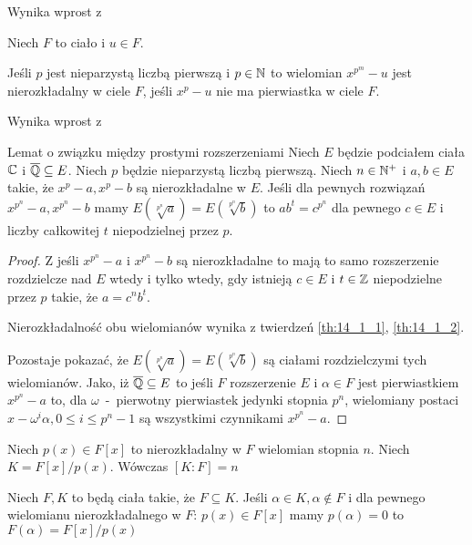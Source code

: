   Wynika wprost z \cite[Twierdzenie 14.1.1]{rom06}

\begin{theorem}
  Niech $F$ to ciało i $u \in F$.

  Jeśli $p$ jest nieparzystą liczbą pierwszą i $p \in \mathbb{N}$ to wielomian
  $x^{p^m} - u$ jest nierozkładalny w ciele $F$, jeśli
  $x^p - u$ nie ma pierwiastka w ciele $F$.
  \label{th:14_1_2}
\end{theorem}

  Wynika wprost z \cite[Twierdzenie 14.1.2]{rom06}

\begin{lemma}{Lemat o związku między prostymi rozszerzeniami}
  Niech $E$ będzie podciałem ciała $\mathbb{C}$ i $\overline{\mathbb{Q}} \subseteq E$.
  Niech $p$ będzie nieparzystą liczbą pierwszą.
  Niech $n \in \mathbb{N}^+$ i $a, b \in E$ takie, że $x^p
  - a, x^p - b$ są nierozkładalne w $E$.
  Jeśli dla pewnych rozwiązań $x^{p^n} - a, x^{p^n} -b$ mamy
  $E\left(\! \sqrt[p^n]{a}\right) = E\left(\! \sqrt[p^n]{b}\right)$ to $ab^t =
  c^{p^n}$ dla pewnego $c \in E$ i liczby całkowitej $t$ niepodzielnej przez
  $p$.
  \label{lem:associated_extensions}
\end{lemma}
\begin{proof}
  Z \cite[Twierdzenie 14.2.8]{rom06} jeśli $x^{p^n} - a$ i $x^{p^n} - b$ są
  nierozkładalne to mają to samo rozszerzenie rozdzielcze nad $E$ wtedy i tylko
  wtedy, gdy istnieją $c \in E$ i $t \in \mathbb{Z}$ niepodzielne przez $p$ takie, że
  $a = c^nb^t$.

  Nierozkładalność obu wielomianów wynika z twierdzeń \ref{th:14_1_1},
  \ref{th:14_1_2}.

  Pozostaje pokazać, że
  $E\left(\! \sqrt[p^n]{a}\right) = E\left(\! \sqrt[p^n]{b}\right)$ są ciałami
  rozdzielczymi tych wielomianów.
  Jako, iż $\overline{\mathbb{Q}} \subseteq E$ to jeśli $F$ rozszerzenie $E$ i $\alpha
  \in F$ jest pierwiastkiem $x^{p^n} -a$ to, dla $\omega$~-~pierwotny
  pierwiastek jedynki stopnia $p^n$, wielomiany postaci $x - \omega^i \alpha, 0
  \leq i \leq p^n - 1$ są wszystkimi czynnikami $x^{p^n} - a$.
\end{proof}

\begin{theorem}
  Niech $p(x) \in F[x]$ to nierozkładalny w $F$ wielomian stopnia $n$.
  Niech $K = F[x]/p(x)$. Wówczas $[K:F] = n$
  \label{th:13_1_6}
\end{theorem}

  \cite[Twierdzenie 13.1.6]{dum04}

\begin{theorem}
  Niech $F, K$ to będą ciała takie, że $F \subseteq K$.
  Jeśli $\alpha \in K, \alpha \not \in F$ i dla pewnego wielomianu
  nierozkładalnego w $F$: $p(x) \in F[x]$ mamy $p(\alpha) = 0$ to
  $F(\alpha) = F[x]/p(x)$
  \label{th:13_1_4}
\end{theorem}

